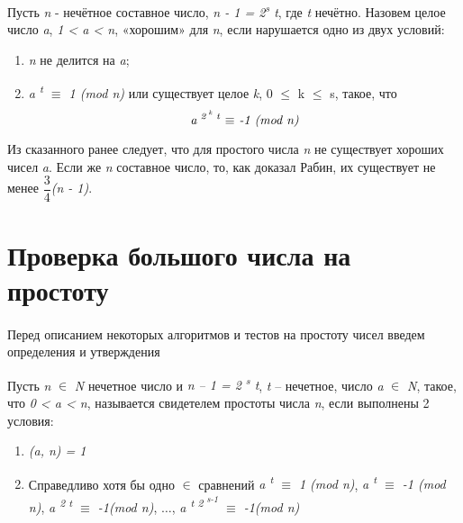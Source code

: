 Пусть \textit{n} - нечётное составное число, \textit{n - 1 = 2\textsuperscript{s} t}, где \textit{t} нечётно. Назовем целое число \textit{a},
\textit{1 < a < n}, «хорошим» для \textit{n}, если нарушается одно из двух условий: 
\begin{enumerate}
 \item \textit{n} не делится на \textit{a};
 \item \textit{a\textsuperscript{ t} {$\equiv$} 1 (mod n)} или существует целое \textit{k}, 0 {$\leq$} k {$\leq$} s, такое, что
  \begin{equation}
      \textit{a\textsuperscript{ 2\textsuperscript{ k} t} {$\equiv$} -1 (mod n)}
  \end{equation}

\end{enumerate}
Из сказанного ранее следует, что для простого числа \textit{n} не существует хороших чисел \textit{a}. Если же \textit{n} составное число, 
то, как доказал Рабин, их существует не менее \textit{{$\dfrac{3}{4}$}(n - 1)}.


\section{Проверка большого числа на простоту}

\paragraph{} Перед описанием некоторых алгоритмов и тестов на простоту чисел введем определения и утверждения

  \begin{definition}    
  
      Пусть \textit{n} {$\in$} \textit{N} нечетное число и \textit{n – 1 = 2\textsuperscript{ s} t}, \textit{t} – нечетное,
    число \textit{a} {$\in$} \textit{N}, такое, что \textit{0 < a < n}, называется свидетелем 
    простоты числа \textit{n}, если выполнены 2 условия:

    \begin{enumerate}
      \item \textit{(a, n) = 1}
      \item Справедливо хотя бы одно {$\in$} сравнений \textit{a\textsuperscript{ t} {$\equiv$} 1 (mod n)}, 
  \textit{a\textsuperscript{ t} {$\equiv$} -1 (mod n)}, \textit{a\textsuperscript{ 2 t} {$\equiv$} -1(mod n)},
  {$\dots$}, \textit{a\textsuperscript{ t 2\textsuperscript{ s-1}} {$\equiv$} -1(mod n)}
    \end{enumerate}
  
  \end{definition}

